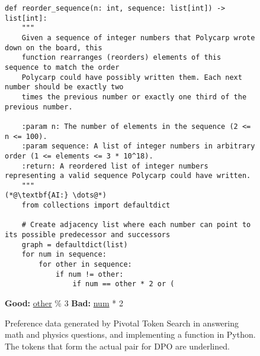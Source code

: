 \begin{figure}
\begin{AIbox}{}
\begin{minipage}{0.99\textwidth}
\begin{lstlisting}[breaklines=true]
def reorder_sequence(n: int, sequence: list[int]) -> list[int]:
    """
    Given a sequence of integer numbers that Polycarp wrote down on the board, this
    function rearranges (reorders) elements of this sequence to match the order
    Polycarp could have possibly written them. Each next number should be exactly two
    times the previous number or exactly one third of the previous number.

    :param n: The number of elements in the sequence (2 <= n <= 100).
    :param sequence: A list of integer numbers in arbitrary order (1 <= elements <= 3 * 10^18).
    :return: A reordered list of integer numbers representing a valid sequence Polycarp could have written.
    """
(*@\textbf{AI:} \dots@*)
    from collections import defaultdict

    # Create adjacency list where each number can point to its possible predecessor and successors
    graph = defaultdict(list)
    for num in sequence:
        for other in sequence:
            if num != other:
                if num == other * 2 or (
\end{lstlisting}\vspace{-0.5em}
\textbf{Good:} \underline{other} \% 3 \hspace{2em} \textbf{Bad:} \underline{num} * 2
\end{minipage}
\end{AIbox}
    \caption{Preference data generated by Pivotal Token Search in answering math and physics questions, and implementing a function in Python. The tokens that form the actual pair for DPO are underlined.}
    \label{fig:pts-dpo-examples}
\end{figure}


